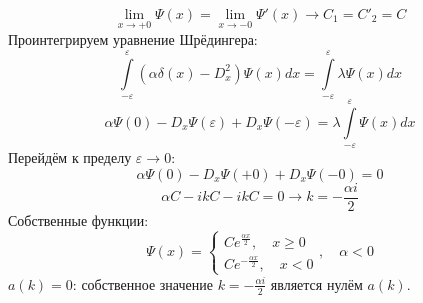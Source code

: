 \documentclass[12pt]{article}
\theoremstyle{definition}
\begin{document}
\begin{itemize}
\begin{equation}
    \end{equation}
    \begin{equation}
        \lim\limits_{x\rightarrow+0}\Psi(x)=\lim\limits_{x\rightarrow-0}\Psi'(x)\rightarrow C_1=C'_2=C
    \end{equation}
    Проинтегрируем уравнение Шрёдингера:
    \begin{equation}
        \int\limits_{-\varepsilon}^\varepsilon(\alpha\delta(x)-D_x^2)\Psi(x) dx=\int\limits_{-\varepsilon}^\varepsilon\lambda\Psi(x) dx
    \end{equation}
    \begin{equation}
        \alpha\Psi(0)-D_x\Psi(\varepsilon)+D_x\Psi(-\varepsilon)=\lambda\int\limits_{-\varepsilon}^\varepsilon\Psi(x) dx
    \end{equation}
    Перейдём к пределу $\varepsilon\rightarrow 0$:
    \begin{equation}
        \alpha\Psi(0)-D_x\Psi(+0)+D_x\Psi(-0)=0
    \end{equation}
    \begin{equation}
        \alpha C-ikC-ikC=0\rightarrow \boxed{k=-\frac{\alpha i}{2}}
    \end{equation}
    Собственные функции:
    \begin{equation}
        \boxed{\Psi(x)=\left\{
        \begin{array}{l}
        Ce^{\frac{\alpha x}{2}},\quad x\geq 0\\
        Ce^{-\frac{\alpha x}{2}},\quad x<0
        \end{array}
        \right.,\quad \alpha<0}
    \end{equation}
    $a(k)=0$: собственное значение $k=-\frac{\alpha i}{2}$ является нулём $a(k)$.
\end{itemize}
\end{document}
